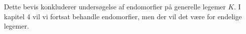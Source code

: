 Dette bevis konkluderer undersøgelse af endomorfier på generelle legemer $K$. I kapitel 4
vil vi fortsat behandle endomorfier, men der vil det være for endelige legemer.



















